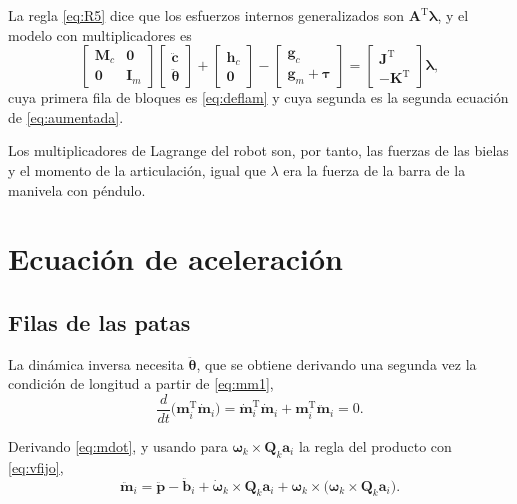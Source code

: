 \documentclass[11pt]{article}
\newcommand{\T}{^{\mathrm{T}}}
\newcommand{\pvec}{\mathbf{p}}
\newcommand{\wv}{\boldsymbol{\omega}}
\newcommand{\lam}{\boldsymbol{\lambda}}
\newcommand{\cdd}{\ddot{\mathbf{c}}}
\newcommand{\thv}{\boldsymbol{\theta}}
\newcommand{\tauv}{\boldsymbol{\tau}}
\begin{document}
La regla \eqref{eq:R5} dice que los esfuerzos internos generalizados son $\mathbf{A}\T\lam$, y el modelo con multiplicadores es
\begin{equation}
\begin{bmatrix}\mathbf{M}_c & \mathbf{0}\\ \mathbf{0} & \mathbf{I}_m\end{bmatrix}
\begin{bmatrix}\cdd\\ \ddot{\thv}\end{bmatrix}
+\begin{bmatrix}\mathbf{h}_c\\ \mathbf{0}\end{bmatrix}
-\begin{bmatrix}\mathbf{g}_c\\ \mathbf{g}_m+\tauv\end{bmatrix}
=\begin{bmatrix}\mathbf{J}\T\\ -\mathbf{K}\T\end{bmatrix}\lam ,
\label{eq:lagmult}
\end{equation}
cuya primera fila de bloques es \eqref{eq:deflam} y cuya segunda es la segunda ecuación de \eqref{eq:aumentada}.

Los multiplicadores de Lagrange del robot son, por tanto, las fuerzas de las bielas y el momento de la articulación, igual que $\lambda$ era la fuerza de la barra de la manivela con péndulo.

\section{Ecuación de aceleración}

\subsection{Filas de las patas}

La dinámica inversa necesita $\ddot{\thv}$, que se obtiene derivando una segunda vez la condición de longitud a partir de \eqref{eq:mm1},
\begin{equation}
\frac{d}{dt}\big(\mathbf{m}_i\T\dot{\mathbf{m}}_i\big)=\dot{\mathbf{m}}_i\T\dot{\mathbf{m}}_i+\mathbf{m}_i\T\ddot{\mathbf{m}}_i=0 .
\label{eq:mm2}
\end{equation}

Derivando \eqref{eq:mdot}, y usando para $\wv_k\times\mathbf{Q}_k\mathbf{a}_i$ la regla del producto con \eqref{eq:vfijo},
\begin{equation}
\ddot{\mathbf{m}}_i=\ddot{\pvec}-\ddot{\mathbf{b}}_i+\dot{\wv}_k\times\mathbf{Q}_k\mathbf{a}_i+\wv_k\times\big(\wv_k\times\mathbf{Q}_k\mathbf{a}_i\big).
\label{eq:mddot}
\end{equation}
\end{document}

